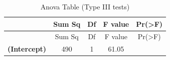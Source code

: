 \documentclass[]{article}
\theoremstyle{definition}
\theoremstyle{definition}
\theoremstyle{definition}
\theoremstyle{remark}
\begin{document}
\begin{longtable}[]{@{}ccccc@{}}
\caption{Anova Table (Type III tests)}\tabularnewline
\toprule
\begin{minipage}[b]{0.24\columnwidth}\centering\strut
~\strut
\end{minipage} & \begin{minipage}[b]{0.11\columnwidth}\centering\strut
Sum Sq\strut
\end{minipage} & \begin{minipage}[b]{0.06\columnwidth}\centering\strut
Df\strut
\end{minipage} & \begin{minipage}[b]{0.12\columnwidth}\centering\strut
F value\strut
\end{minipage} & \begin{minipage}[b]{0.13\columnwidth}\centering\strut
Pr(\textgreater{}F)\strut
\end{minipage}\tabularnewline
\midrule
\endfirsthead
\toprule
\begin{minipage}[b]{0.24\columnwidth}\centering\strut
~\strut
\end{minipage} & \begin{minipage}[b]{0.11\columnwidth}\centering\strut
Sum Sq\strut
\end{minipage} & \begin{minipage}[b]{0.06\columnwidth}\centering\strut
Df\strut
\end{minipage} & \begin{minipage}[b]{0.12\columnwidth}\centering\strut
F value\strut
\end{minipage} & \begin{minipage}[b]{0.13\columnwidth}\centering\strut
Pr(\textgreater{}F)\strut
\end{minipage}\tabularnewline
\midrule
\endhead
\begin{minipage}[t]{0.24\columnwidth}\centering\strut
\textbf{(Intercept)}\strut
\end{minipage} & \begin{minipage}[t]{0.11\columnwidth}\centering\strut
490\strut
\end{minipage} & \begin{minipage}[t]{0.06\columnwidth}\centering\strut
1\strut
\end{minipage} & \begin{minipage}[t]{0.12\columnwidth}\centering\strut
61.05\strut
\end{minipage} & \begin{minipage}[t]{0.13\columnwidth}\centering\strut

\end{minipage}
\end{longtable}
\end{document}
